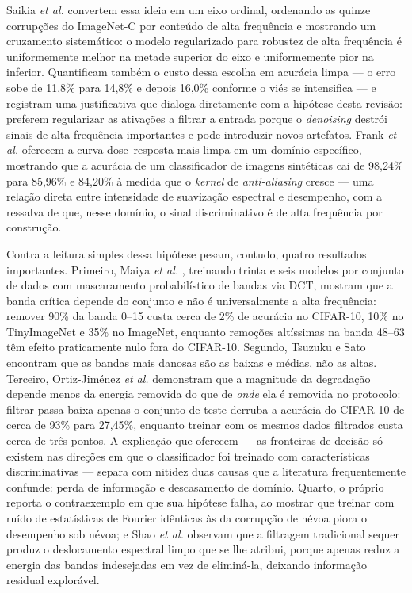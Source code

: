 \documentclass[conference]{IEEEtran}
\begin{document}
Saikia \textit{et al.} \cite{b20} convertem essa ideia em um eixo ordinal,
ordenando as quinze corrupções do ImageNet-C por conteúdo de alta frequência e
mostrando um cruzamento sistemático: o modelo regularizado para robustez de
alta frequência é uniformemente melhor na metade superior do eixo e
uniformemente pior na inferior. Quantificam também o custo dessa escolha em
acurácia limpa --- o erro sobe de 11,8\% para 14,8\% e depois 16,0\% conforme o
viés se intensifica --- e registram uma justificativa que dialoga diretamente
com a hipótese desta revisão: preferem regularizar as ativações a filtrar a
entrada porque o \textit{denoising} destrói sinais de alta frequência
importantes e pode introduzir novos artefatos. Frank \textit{et al.}
\cite{b21} oferecem a curva dose--resposta mais limpa em um domínio específico,
mostrando que a acurácia de um classificador de imagens sintéticas cai de
98,24\% para 85,96\% e 84,20\% à medida que o \textit{kernel} de
\textit{anti-aliasing} cresce --- uma relação direta entre intensidade de
suavização espectral e desempenho, com a ressalva de que, nesse domínio, o
sinal discriminativo é de alta frequência por construção.

Contra a leitura simples dessa hipótese pesam, contudo, quatro resultados
importantes. Primeiro, Maiya \textit{et al.} \cite{b22}, treinando trinta e
seis modelos por conjunto de dados com mascaramento probabilístico de bandas
via DCT, mostram que a banda crítica depende do conjunto e não é universalmente
a alta frequência: remover 90\% da banda 0--15 custa cerca de 2\% de acurácia
no CIFAR-10, 10\% no TinyImageNet e 35\% no ImageNet, enquanto remoções
altíssimas na banda 48--63 têm efeito praticamente nulo fora do CIFAR-10.
Segundo, Tsuzuku e Sato \cite{b19} encontram que as bandas mais danosas são as
baixas e médias, não as altas. Terceiro, Ortiz-Jiménez \textit{et al.}
\cite{b23} demonstram que a magnitude da degradação depende menos da energia
removida do que de \emph{onde} ela é removida no protocolo: filtrar passa-baixa
apenas o conjunto de teste derruba a acurácia do CIFAR-10 de cerca de 93\% para
27,45\%, enquanto treinar com os mesmos dados filtrados custa cerca de três
pontos. A explicação que oferecem --- as fronteiras de decisão só existem nas
direções em que o classificador foi treinado com características
discriminativas --- separa com nitidez duas causas que a literatura
frequentemente confunde: perda de informação e descasamento de domínio. Quarto,
o próprio \cite{b18} reporta o contraexemplo em que sua hipótese falha, ao
mostrar que treinar com ruído de estatísticas de Fourier idênticas às da
corrupção de névoa piora o desempenho sob névoa; e Shao \textit{et al.}
\cite{b24} observam que a filtragem tradicional sequer produz o deslocamento
espectral limpo que se lhe atribui, porque apenas reduz a energia das bandas
indesejadas em vez de eliminá-la, deixando informação residual explorável.
\end{document}
